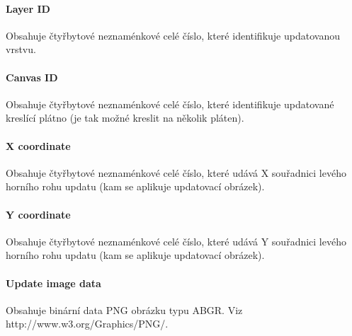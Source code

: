 \documentclass[12pt,oneside,a4paper]{report}
\begin{document}
\paragraph{Layer ID}
Obsahuje čtyřbytové neznaménkové celé číslo, které identifikuje updatovanou vrstvu.

\paragraph{Canvas ID}
Obsahuje čtyřbytové neznaménkové celé číslo, které identifikuje updatované kreslící plátno (je tak možné kreslit na několik pláten).

\paragraph{X coordinate}
Obsahuje čtyřbytové neznaménkové celé číslo, které udává X souřadnici levého horního rohu updatu (kam se aplikuje updatovací obrázek).

\paragraph{Y coordinate}
Obsahuje čtyřbytové neznaménkové celé číslo, které udává Y souřadnici levého horního rohu updatu (kam se aplikuje updatovací obrázek).

\paragraph{Update image data}
Obsahuje binární data PNG obrázku typu ABGR. Viz http://www.w3.org/Graphics/PNG/. 
\end{document}

